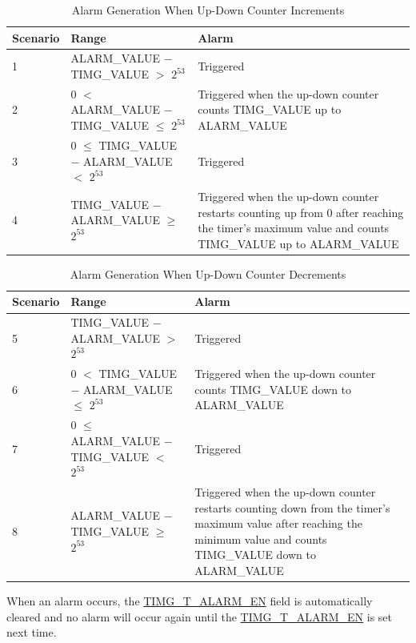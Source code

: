 \documentclass[main\_\_EN.tex]{subfiles}
\begin{document}
\begin{table}[H]
\centering
\caption{Alarm Generation When Up-Down Counter Increments}
\label{tab:timg-alarm-generation-up}

\begin{tabular}{|l|l|m{7cm}|}
\hline
\rowcolor{lightgray}
    \textbf{Scenario} & \textbf{Range} & \textbf{Alarm} \\\hline
     1 & ALARM\_VALUE $-$ TIMG\_VALUE $>$ $2^{53}$ & Triggered \\\hline
     2 & 0 $<$ ALARM\_VALUE $-$ TIMG\_VALUE $\leq$ $2^{53}$ & Triggered when the up-down counter counts TIMG\_VALUE up to ALARM\_VALUE \\\hline
     3 & 0 $\leq$ TIMG\_VALUE $-$ ALARM\_VALUE $<$ $2^{53}$ & Triggered \\\hline
     4 & TIMG\_VALUE $-$ ALARM\_VALUE $\geq$ $2^{53}$ & Triggered when the up-down counter restarts counting up from 0 after reaching the timer's maximum value and counts TIMG\_VALUE up to ALARM\_VALUE \\\hline
\end{tabular}
\end{table}

\begin{table}[H]
\centering
\caption{Alarm Generation When Up-Down Counter Decrements}
\label{tab:timg-alarm-generation-down}

\begin{tabular}{|l|l|m{7cm}|}
\hline
\rowcolor{lightgray}
    \textbf{Scenario} & \textbf{Range} & \textbf{Alarm} \\\hline
     5 & TIMG\_VALUE $-$ ALARM\_VALUE  $>$ $2^{53}$ & Triggered \\\hline
     6 &  0 $<$ TIMG\_VALUE $-$ ALARM\_VALUE $\leq$ $2^{53}$ & Triggered when the up-down counter counts TIMG\_VALUE down to ALARM\_VALUE \\\hline
     7 & 0 $\leq$ ALARM\_VALUE $-$ TIMG\_VALUE $<$ $2^{53}$ & Triggered \\\hline
     8 & ALARM\_VALUE $-$ TIMG\_VALUE $\geq$ $2^{53}$ & Triggered when the up-down counter restarts counting down from the timer's maximum value after reaching the minimum value and counts TIMG\_VALUE down to ALARM\_VALUE \\\hline
\end{tabular}
\end{table}

When an alarm occurs, the \hyperref[fielddesc:TIMGTXALARMEN]{TIMG\_T\_ALARM\_EN} field is automatically cleared and no alarm will occur again until the \hyperref[fielddesc:TIMGTXALARMEN]{TIMG\_T\_ALARM\_EN} is set next time.
\end{document}
